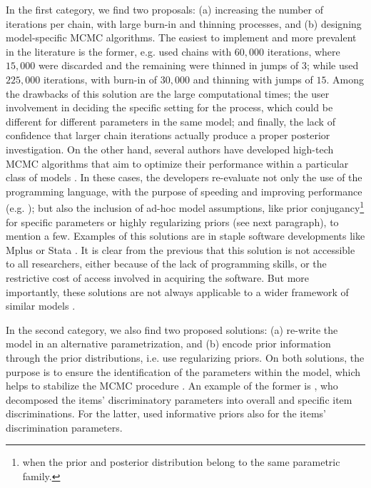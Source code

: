 In the first category, we find two proposals: (a) increasing the number of iterations per chain, with large burn-in and thinning processes, and (b) designing model-specific MCMC algorithms. The easiest to implement and more prevalent in the literature is the former, e.g. \citet{Fujimoto_2018a} used chains with $60,000$ iterations, where $15,000$ were discarded and the remaining were thinned in jumps of $3$; while \citet{Fujimoto_2018b} used $225,000$ iterations, with burn-in of $30,000$ and thinning with jumps of $15$. Among the drawbacks of this solution are the large computational times; the user involvement in deciding the specific setting for the process, which could be different for different parameters in the same model; and finally, the lack of confidence that larger chain iterations actually produce a proper posterior investigation. On the other hand, several authors have developed high-tech MCMC algorithms that aim to optimize their performance within a particular class of models \cite{Papaspiliopoulos_et_al_2007}. In these cases, the developers re-evaluate not only the use of the programming language, with the purpose of speeding and improving performance (e.g. \citet{Fujimoto_2018a}); but also the inclusion of ad-hoc model assumptions, like prior conjugancy\footnote{when the prior and posterior distribution belong to the same parametric family.} for specific parameters or highly regularizing priors (see next paragraph), to mention a few. Examples of this solutions are in staple software developments like Mplus \cite{Muthen_et_al_2011} or Stata \cite{Rabe_et_al_2004c}. It is clear from the previous that this solution is not accessible to all researchers, either because of the lack of programming skills, or the restrictive cost of access involved in acquiring the software. But more importantly, these solutions are not always applicable to a wider framework of similar models \cite{Papaspiliopoulos_et_al_2007}.

In the second category, we also find two proposed solutions: (a) re-write the model in an alternative parametrization, and (b) encode prior information through the prior distributions, i.e. use regularizing priors. On both solutions, the purpose is to ensure the identification of the parameters within the model, which helps to stabilize the MCMC procedure \cite{Gelman_et_al_2014}. An example of the former is \citet{Fujimoto_2018a}, who decomposed the items' discriminatory parameters into overall and specific item discriminations. For the latter, \citet{Fujimoto_2020} used informative priors also for the items' discrimination parameters.

